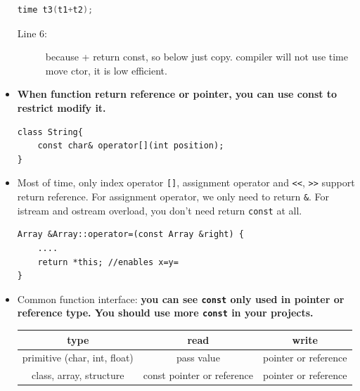 \documentclass[a4paper,11pt,twoside]{book}
\newcommand{\tophline}{\hline }
\newcommand{\bottomhline}{\\ \hline }
\newcommand{\tophline}{ }
\newcommand{\bottomhline}{ }
\begin{document}
\begin{itemize}
\begin{lstlisting}[frame=single, language=c++]
time t3(t1+t2);
\end{lstlisting}
\begin{description}
	\item[Line 6:] because + return const, so below just copy. compiler will not use time move ctor, it is low efficient.
	
\end{description}
	
	\item \textbf{When function return reference or pointer, you can use const to restrict modify it.}
\begin{lstlisting}[numbers=none]
class String{
	const char& operator[](int position);
}
\end{lstlisting}
	
	\item Most of time, only index operator \verb=[]=, assignment operator and \verb|<<|, \verb|>>| support return reference. For assignment operator, we only need to return \texttt{\&}.  For istream and ostream overload, you don't need return \texttt{const} at all. 
\begin{lstlisting}[numbers=none]
Array &Array::operator=(const Array &right) {
	....
	return *this; //enables x=y= 
}
\end{lstlisting} 
	
	\item Common function interface: \textbf{you can see \texttt{const} only used in pointer or reference type. You should use more \texttt{const} in your projects. }
	
	\begin{tabular}{|c|c|c|}
		\tophline
		\textbf{type} & \textbf{read} & \textbf{write} \\ \tophline
		
		primitive (char, int, float) & pass value & pointer or reference \\ \tophline
		class, array, structure  & const pointer or reference &  pointer or reference \bottomhline
	\end{tabular}
\end{itemize}
\end{document}
